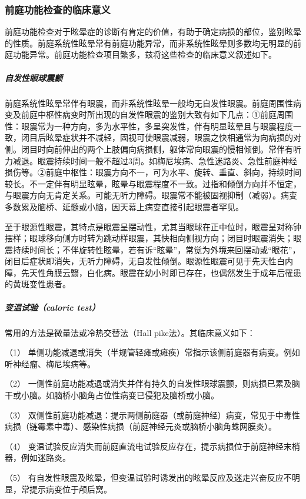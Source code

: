 \subsubsection{前庭功能检查的临床意义}

前庭功能检查对于眩晕症的诊断有肯定的价值，有助于确定病损的部位，鉴别眩晕的性质。前庭系统性眩晕常有前庭功能异常，而非系统性眩晕则多数均无明显的前庭功能异常。前庭功能检查项目繁多，兹将这些检查的临床意义叙述如下。

\subparagraph{自发性眼球震颤}

前庭系统性眩晕常伴有眼震，而非系统性眩晕一般均无自发性眼震。前庭周围性病变及前庭中枢性病变时所出现的自发性眼震的鉴别大致有如下几点：①前庭周围性：眼震常为一种方向，多为水平性，多呈突发性，伴有明显眩晕且与眼震程度一致，闭目后眩晕症状并不减轻，固视可使眼震减弱，眼震之快相通常为向病损的对侧。闭目时向前伸出的两个上肢偏向病损侧，躯体常向眼震的慢相倾倒。常伴有听力减退。眼震持续时间一般不超过3周。如梅尼埃病、急性迷路炎、急性前庭神经损伤等。②前庭中枢性：眼震方向不一，可为水平、旋转、垂直、斜向，持续时间较长。不一定伴有明显眩晕，眩晕与眼震程度不一致。过指和倾倒方向并不恒定，与眼震方向无肯定关系。可能无听力障碍。眼震常不能被固视抑制（减弱）。病变多数累及脑桥、延髓或小脑，因天幕上病变直接引起眼震者罕见。

至于眼源性眼震，其特点是眼震呈摆动性，尤其当眼球在正中位时，眼震呈对称钟摆样；眼球移向侧方时转为跳动样眼震，其快相向侧视方向；闭目时眼震消失；眼震持续时间长；不伴旋转性眩晕，若有诉“眩晕”，常觉为外境来回摆动或“眼花”，闭目后症状即消失，无听力障碍，无自发性倾倒。眼源性眼震可见于先天性白内障，先天性角膜云翳，白化病。眼震在幼小时即已存在，也偶然发生于成年后罹患的黄斑变性患者。

\subparagraph{变温试验（caloric test）}

常用的方法是微量法或冷热交替法（Hall pike法）。其临床意义如下：

（1）
单侧功能减退或消失（半规管轻瘫或瘫痪）常指示该侧前庭器有病变。例如听神经瘤、梅尼埃病等。

（2）
一侧性前庭功能减退或消失并伴有持久的自发性眼球震颤，则病损已累及脑干或小脑。如脑桥小脑角占位性病变已侵犯及脑桥或小脑。

（3）
双侧性前庭功能减退：提示两侧前庭器（或前庭神经）病变，常见于中毒性病损（链霉素中毒）、感染性病损（前庭神经元炎或脑桥小脑角蛛网膜炎）。

（4）
变温试验反应消失而前庭直流电试验反应存在，提示病损位于前庭神经末梢器，例如迷路炎。

（5）
有自发性眼震及眩晕，但变温试验时诱发出的眩晕反应及迷走兴奋反应不明显，常提示病变位于颅后窝。

